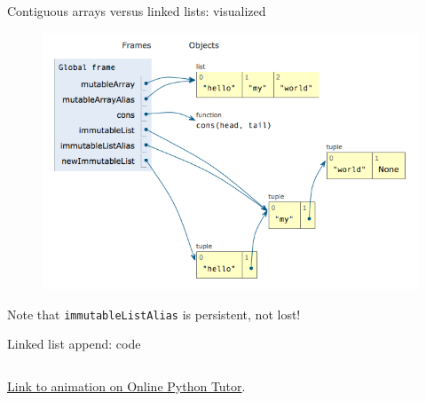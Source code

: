 \begin{frame}{Contiguous arrays versus linked lists: visualized}
  \begin{figure}
    \includegraphics[height=0.7\textheight]{lists.png}
  \end{figure}

  Note that \texttt{immutableListAlias} is persistent, not lost!
\end{frame}

\begin{frame}[fragile]{Linked list append: code}
  \inputminted{python}{lists2.py}

\href{http://www.pythontutor.com/visualize.html#code=def+cons(head,+tail%29%3A%0A++++return+(head,+tail%29%0A%0Adef+append(list1,+list2%29%3A%0A++++if+list1+is+None%3A%0A++++++++return+list2%0A++++else%3A%0A++++++++head1,+tail1+%3D+list1%0A++++++++return+cons(head1,+append(tail1,+list2%29%29%0A++++++++%0Afirst+%3D+cons(%221%22,+cons(%222%22,+None%29%29%0Asecond+%3D+cons(%223%22,+cons(%224%22,+None%29%29%0Athird+%3D+append(first,+second%29&mode=display&origin=opt-frontend.js&cumulative=false&heapPrimitives=false&textReferences=false&py=2&rawInputLstJSON=%5B%5D&curInstr=37}{Link to animation on Online Python Tutor}.
\end{frame}

